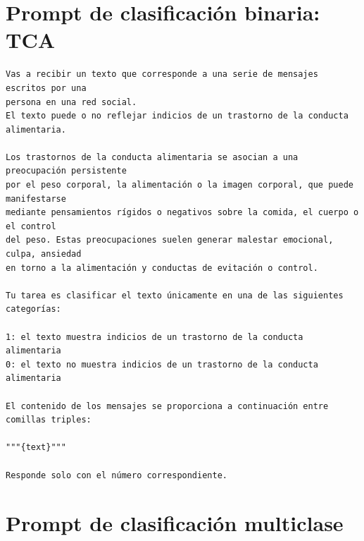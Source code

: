 \section{Prompt de clasificación binaria: TCA}

\begin{lstlisting}[style=promptstyle]
Vas a recibir un texto que corresponde a una serie de mensajes escritos por una 
persona en una red social.
El texto puede o no reflejar indicios de un trastorno de la conducta alimentaria.

Los trastornos de la conducta alimentaria se asocian a una preocupación persistente 
por el peso corporal, la alimentación o la imagen corporal, que puede manifestarse 
mediante pensamientos rígidos o negativos sobre la comida, el cuerpo o el control 
del peso. Estas preocupaciones suelen generar malestar emocional, culpa, ansiedad 
en torno a la alimentación y conductas de evitación o control.

Tu tarea es clasificar el texto únicamente en una de las siguientes categorías:

1: el texto muestra indicios de un trastorno de la conducta alimentaria
0: el texto no muestra indicios de un trastorno de la conducta alimentaria

El contenido de los mensajes se proporciona a continuación entre comillas triples:

"""{text}"""

Responde solo con el número correspondiente.
\end{lstlisting}


\section{Prompt de clasificación multiclase}

